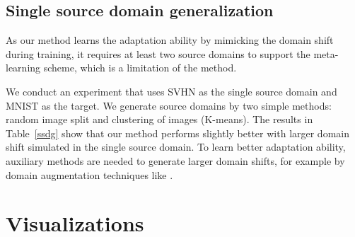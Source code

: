 \documentclass{article} \usepackage[table]{xcolor}
\begin{document}
\subsection{Single source domain generalization}
As our method learns the adaptation ability by mimicking the domain shift during training, it requires at least two source domains to support the meta-learning scheme, which is a limitation of the method.


We conduct an experiment that uses SVHN as the single source domain and MNIST as the target. We generate source domains by two simple methods: random image split and clustering of images (K-means). The results in Table~\ref{ssdg} show that our method performs slightly better with larger domain shift simulated in the single source domain. To learn better adaptation ability, auxiliary methods are needed to generate larger domain shifts, for example by domain augmentation techniques like \cite{qiao2020learning}.
\begin{table}[t]
\vspace{-2mm}
\centering
\caption{
Experiments on single source domain generalization. We use SVHN as the source domain and MNIST as the target. Our method performs slightly better with larger domain shift simulated in the single source domain.
}
\vspace{-1mm}
\centering
\label{ssdg}
\end{table}



\section{Visualizations}
\label{appvis}
\end{document}
